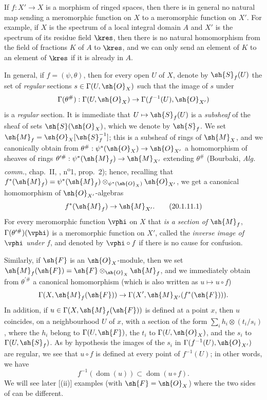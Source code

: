 \begin{env}[20.1.11]
\label{IV.20.1.11}
If $f:X'\to X$ is a morphism of ringed spaces, then there is in general no natural map sending a meromorphic function on $X$ to a meromorphic function on $X'$.
For example, if $X$ is the spectrum of a local integral domain $A$ and $X'$ is the spectrum of its residue field $\kres$, then there is no natural homomorphism from the field of fractions $K$ of $A$ to $\kres$, and we can only send an element of $K$ to an element of $\kres$ if it is already in $A$.

In general, if $f=(\psi,\theta)$, then for every open $U$ of $X$, denote by $\sh{S}_f(U)$ the set of \emph{regular} sections $s\in\Gamma(U,\sh{O}_X)$ such that the image of $s$ under
\[
  \Gamma(\theta^\#):\Gamma(U,\sh{O}_X)\to\Gamma(f^{-1}(U),\sh{O}_{X'})
\]
is a \emph{regular} section.
It is immediate that $U\mapsto\sh{S}_f(U)$ is a \emph{subsheaf} of the sheaf of sets $\sh{S}(\sh{O}_X)$, which we denote by $\sh{S}_f$.
We set $\sh{M}_f=\sh{O}_X[\sh{S}_f^{-1}]$;
this is a subsheaf
of rings of $\sh{M}_X$, and we canonically obtain from $\theta^\#:\psi^*(\sh{O}_X)\to\sh{O}_{X'}$ a homomorphism of sheaves of rings $\theta^{\prime\#}:\psi^*(\sh{M}_f)\to\sh{M}_{X'}$ extending $\theta^\#$ (Bourbaki, \emph{Alg. comm.}, chap.~II, , n\textsuperscript{o}1, prop.~2);
hence, recalling that $f^*(\sh{M}_f)=\psi^*(\sh{M}_f)\otimes_{\psi^*(\sh{O}_X)}\sh{O}_{X'}$,
we get a canonical homomorphism of $\sh{O}_{X'}$-algebras
\[
\label{IV.20.1.11.1}
  f^*(\sh{M}_f)\to\sh{M}_{X'}.
  \tag{20.1.11.1}
\]
For every meromorphic function $\vphi$ on $X$ that \emph{is a section of $\sh{M}_f$}, $\Gamma(\theta^{\prime\#})(\vphi)$ is a meromorphic function on $X'$, called the \emph{inverse image of $\vphi$ under $f$}, and denoted by $\vphi\circ f$ if there is no cause for confusion.

Similarly, if $\sh{F}$ is an $\sh{O}_X$-module, then we set $\sh{M}_f(\sh{F})=\sh{F}\otimes_{\sh{O}_X}\sh{M}_f$, and we immediately obtain from $\theta^{\prime\#}$ a canonical homomorphism (which is also written as $u\mapsto u\circ f$)
\[
  \Gamma(X,\sh{M}_f(\sh{F}))\to\Gamma(X',\sh{M}_{X'}(f^*(\sh{F}))).
\]
In addition, if $u\in\Gamma(X,\sh{M}_f(\sh{F}))$ is defined  at a point $x$, then $u$ coincides, on a neighbourhood $U$ of $x$, with a section of the form $\sum_i h_i\otimes(t_i/s_i)$, where the $h_i$ belong to $\Gamma(U,\sh{F})$, the $t_i$ to $\Gamma(U,\sh{O}_X)$, and the $s_i$ to $\Gamma(U,\sh{S}_f)$.
As by hypothesis the images of the $s_i$ in $\Gamma(f^{-1}(U),\sh{O}_{X'})$ are regular, we see that $u\circ f$ is defined at every point of $f^{-1}(U)$;
in other words, we have
\[
\label{IV.20.1.11.2}
  f^{-1}(\operatorname{dom}(u))\subset\operatorname{dom}(u\circ f).
  \tag{20.1.11.2}
\]
We will see later [(ii)] examples (with $\sh{F}=\sh{O}_X$) where the two sides of  can be different.


\end{env}
